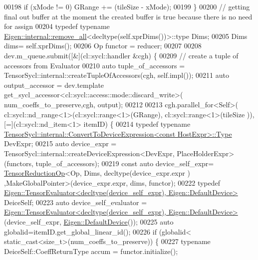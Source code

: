 \begin{DoxyCode}
00198       \textcolor{keywordflow}{if} (xMode != 0) GRange += (tileSize - xMode);
00199     \}
00200     \textcolor{comment}{// getting final out buffer at the moment the created buffer is true because there is no need for
       assign}
00204 \textcolor{comment}{}    \textcolor{keyword}{typedef} \textcolor{keyword}{typename} \hyperlink{struct_eigen_1_1internal_1_1remove__all}{Eigen::internal::remove\_all}<decltype(\textcolor{keyword}{self}.xprDims())>::type
       Dims;
00205     Dims dims= \textcolor{keyword}{self}.xprDims();
00206     Op functor = reducer;
00207 
00208     dev.m\_queue.submit([&](cl::sycl::handler &cgh) \{
00209       \textcolor{comment}{// create a tuple of accessors from Evaluator}
00210       \textcolor{keyword}{auto} tuple\_of\_accessors =  TensorSycl::internal::createTupleOfAccessors(cgh, \textcolor{keyword}{self}.impl());
00211       \textcolor{keyword}{auto} output\_accessor = dev.template get\_sycl\_accessor<cl::sycl::access::mode::discard\_write>(
      num\_coeffs\_to\_preserve,cgh, output);
00212 
00213       cgh.parallel\_for<Self>( cl::sycl::nd\_range<1>(cl::sycl::range<1>(GRange), cl::sycl::range<1>(tileSize
      )), [=](cl::sycl::nd\_item<1> itemID) \{
00214         \textcolor{keyword}{typedef} \textcolor{keyword}{typename} 
      \hyperlink{struct_eigen_1_1_tensor_sycl_1_1internal_1_1_convert_to_device_expression}{TensorSycl::internal::ConvertToDeviceExpression<const HostExpr>::Type}
       DevExpr;
00215         \textcolor{keyword}{auto} device\_expr = TensorSycl::internal::createDeviceExpression<DevExpr, PlaceHolderExpr>(functors,
       tuple\_of\_accessors);
00219         \textcolor{keyword}{const} \textcolor{keyword}{auto} device\_self\_expr= \hyperlink{class_eigen_1_1_tensor_reduction_op}{TensorReductionOp}<Op, Dims, decltype(device\_expr.expr
      ) ,MakeGlobalPointer>(device\_expr.expr, dims, functor);
00222         \textcolor{keyword}{typedef} 
      \hyperlink{struct_eigen_1_1_tensor_evaluator}{Eigen::TensorEvaluator<decltype(device\_self\_expr), Eigen::DefaultDevice>}
       DeiceSelf;
00223         \textcolor{keyword}{auto} device\_self\_evaluator = 
      \hyperlink{struct_eigen_1_1_tensor_evaluator}{Eigen::TensorEvaluator<decltype(device\_self\_expr), Eigen::DefaultDevice>}
      (device\_self\_expr, \hyperlink{struct_eigen_1_1_default_device}{Eigen::DefaultDevice}());
00225         \textcolor{keyword}{auto} globalid=itemID.get\_global\_linear\_id();
00226         \textcolor{keywordflow}{if} (globalid< static\_cast<size\_t>(num\_coeffs\_to\_preserve)) \{
00227           \textcolor{keyword}{typename} DeiceSelf::CoeffReturnType accum = functor.initialize();

\end{DoxyCode}
